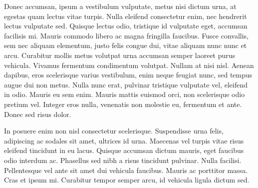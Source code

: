 \documentclass[10pt]{article}
\begin{document}
Donec accumsan, ipsum a vestibulum vulputate, metus nisi dictum urna, at
egestas quam lectus vitae turpis. Nulla eleifend consectetur enim, nec
hendrerit lectus vulputate sed. Quisque lectus odio, tristique id vulputate
eget, accumsan facilisis mi. Mauris commodo libero ac magna fringilla
faucibus. Fusce convallis, sem nec aliquam elementum, justo felis congue
dui, vitae aliquam nunc nunc et arcu. Curabitur mollis metus volutpat urna
accumsan semper laoreet purus vehicula. Vivamus fermentum condimentum
volutpat. Nullam at nisi nisl. Aenean dapibus, eros scelerisque varius
vestibulum, enim neque feugiat nunc, sed tempus augue dui non metus. Nulla
nunc erat, pulvinar tristique vulputate vel, eleifend in odio. Mauris eu sem
enim. Mauris mattis euismod orci, non scelerisque odio pretium vel. Integer
eros nulla, venenatis non molestie eu, fermentum et ante. Donec sed risus
dolor.

In posuere enim non nisl consectetur scelerisque. Suspendisse urna felis,
adipiscing ac sodales sit amet, ultrices id urna. Maecenas vel turpis vitae
risus eleifend tincidunt in eu lacus. Quisque accumsan dictum mauris, eget
faucibus odio interdum ac. Phasellus sed nibh a risus tincidunt pulvinar.
Nulla facilisi. Pellentesque vel ante sit amet dui vehicula faucibus. Mauris
ac porttitor massa. Cras et ipsum mi. Curabitur tempor semper arcu, id
vehicula ligula dictum sed. 
\end{document}
